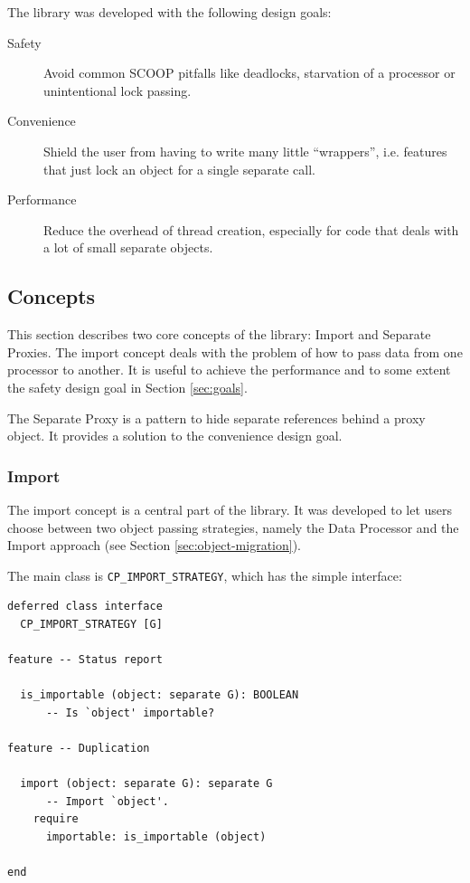 \documentclass[a4paper,10pt,titlepage]{article}
\begin{document}
The library was developed with the following design goals:

\begin{description}
 \item [Safety]\label{item:safety} Avoid common SCOOP pitfalls like deadlocks, starvation of a processor or unintentional lock passing.
 \item [Convenience]\label{item:convenience} Shield the user from having to write many little ``wrappers'', i.e. features that just lock an object for a single separate call.
 \item [Performance]\label{item:performance} Reduce the overhead of thread creation, especially for code that deals with a lot of small separate objects.
\end{description}

\subsection{Concepts}

This section describes two core concepts of the library: Import and Separate Proxies.
The import concept deals with the problem of how to pass data from one processor to another.
It is useful to achieve the performance and to some extent the safety design goal in Section \ref{sec:goals}.

The Separate Proxy  is a pattern to hide separate references behind a proxy object.
It provides a solution to the convenience design goal.

\subsubsection{Import}
\label{sec:concepts:import}

The import concept is a central part of the library.
It was developed to let users choose between two object passing strategies, namely the Data Processor and the Import approach (see Section \ref{sec:object-migration}).

The main class is \lstinline!CP_IMPORT_STRATEGY!, which has the simple interface:

\begin{lstlisting}[language=OOSC2Eiffel, captionpos=b, caption={The deferred class CP\_IMPORT\_STRATEGY.}]
deferred class interface
  CP_IMPORT_STRATEGY [G]

feature -- Status report

  is_importable (object: separate G): BOOLEAN
      -- Is `object' importable?

feature -- Duplication

  import (object: separate G): separate G
      -- Import `object'.
    require
      importable: is_importable (object)

end
\end{lstlisting}
\end{document}
